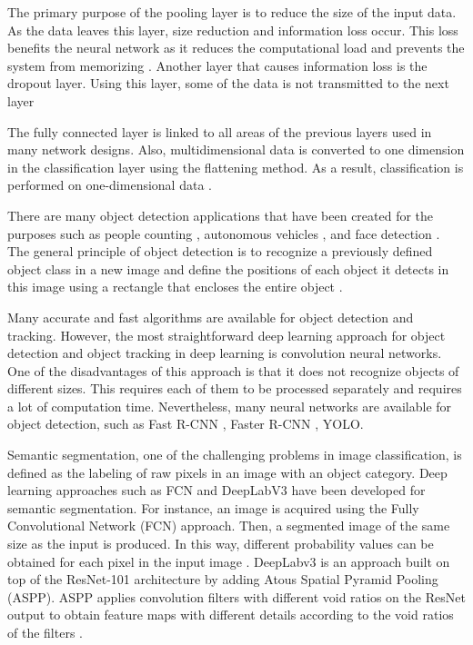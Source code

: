 The primary purpose of the pooling layer is to reduce the size of the input data. As the data leaves this layer, size reduction and information loss occur. This loss benefits the neural network as it reduces the computational load and prevents the system from memorizing \cite{goodfellow2016deep}. Another layer that causes information loss is the dropout layer. Using this layer, some of the data is not transmitted to the next layer


The fully connected layer is linked to all areas of the previous layers used in many network designs. Also, multidimensional data is converted to one dimension in the classification layer using the flattening method. As a result, classification is performed on one-dimensional data \cite{goodfellow2016deep}.

There are many object detection applications that have been created for the purposes such as people counting \cite{nogueira2019retailnet}, autonomous vehicles \cite{rausch2017learning}, and face detection \cite{yang2015facial}. The general principle of object detection is to recognize a previously defined object class in a new image and define the positions of each object it detects in this image using a rectangle that encloses the entire object \cite{goodfellow2016deep}.

Many accurate and fast algorithms are available for object detection and tracking. However, the most straightforward deep learning approach for object detection and object tracking in deep learning is convolution neural networks.  One of the disadvantages of this approach is that it does not recognize objects of different sizes. This requires each of them to be processed separately and requires a lot of computation time. Nevertheless, many neural networks are available for object detection, such as Fast R-CNN \cite{girshick2015fast}, Faster R-CNN \cite{ren2016faster}, YOLO\cite{redmon2018yolov3}.

Semantic segmentation, one of the challenging problems in image classification, is defined as the labeling of raw pixels in an image with an object category. Deep learning approaches such as FCN and DeepLabV3 have been developed for semantic segmentation. For instance, an image is acquired using the Fully Convolutional Network (FCN) approach. Then, a segmented image of the same size as the input is produced. In this way, different probability values can be obtained for each pixel in the input image \cite{long2015fully}. DeepLabv3 is an approach built on top of the ResNet-101 \cite{deepResidualLearning2016} architecture by adding Atous Spatial Pyramid Pooling (ASPP). ASPP applies convolution filters with different void ratios on the ResNet output to obtain feature maps with different details according to the void ratios of the filters \cite{chen2017rethinking}.